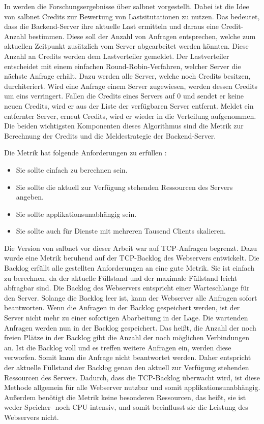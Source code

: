 \documentclass[a4paper, 12pt, BCOR10mm, DIV12, toc=bibliography, toc=listof, german]{scrbook}
\begin{document}
			In \cite{zinke2012} werden die Forschungsergebnisse über salbnet vorgestellt.  Dabei ist die
			Idee von salbnet Credits zur Bewertung von Lastsitutationen zu nutzen. Das bedeutet, dass die
			Backend-Server ihre aktuelle Last ermitteln und daraus eine Credit-Anzahl bestimmen. Diese
			soll der Anzahl von Anfragen entsprechen, welche zum aktuellen Zeitpunkt zusätzlich vom Server
			abgearbeitet werden könnten. Diese Anzahl an Credits werden dem Lastverteiler gemeldet. Der
			Lastverteiler entscheidet mit einem einfachen Round-Robin-Verfahren, welcher Server die
			nächste Anfrage erhält.  Dazu werden alle Server, welche noch Credits besitzen, durchiteriert.
			Wird eine Anfrage einem Server zugewiesen, werden dessen Credits um eins verringert. Fallen
			die Credits eines Servers auf 0 und sendet er keine neuen Credits, wird er aus der Liste der
			verfügbaren Server entfernt. Meldet ein entfernter Server, erneut Credits, wird er wieder in
			die Verteilung aufgenommen. Die beiden wichtigsten Komponenten dieses Algorithmus sind die
			Metrik zur Berechnung der Credits und die Meldestrategie der Backend-Server.

			Die Metrik hat folgende Anforderungen zu erfüllen \cite{scsczile2008}:

			\begin{itemize}
				\item Sie sollte einfach zu berechnen sein.
				\item Sie sollte die aktuell zur Verfügung stehenden Ressourcen des Servers angeben.
				\item Sie sollte applikationsunabhängig sein.
				\item Sie sollte auch für Dienste mit mehreren Tausend Clients skalieren.
			\end{itemize}

			Die Version von salbnet vor dieser Arbeit war auf TCP-Anfragen begrenzt. Dazu wurde eine
			Metrik beruhend auf der TCP-Backlog des Webservers entwickelt. Die Backlog erfüllt alle
			gestellten Anforderungen an eine gute Metrik. Sie ist einfach zu berechnen, da der aktuelle
			Füllstand und der maximale Füllstand leicht abfragbar sind. Die Backlog des Webservers
			entspricht einer Warteschlange für den Server. Solange die Backlog leer ist, kann der
			Webserver alle Anfragen sofort beantworten. Wenn die Anfragen in der Backlog gespeichert
			werden, ist der Server nicht mehr zu einer sofortigen Abarbeitung in der Lage. Die wartenden
			Anfragen werden nun in der Backlog gespeichert. Das heißt, die Anzahl der noch freien Plätze
			in der Backlog gibt die Anzahl der noch möglichen Verbindungen an. Ist die Backlog voll und es
			treffen weitere Anfragen ein, werden diese verworfen.  Somit kann die Anfrage nicht
			beantwortet werden.  Daher entspricht der aktuelle Füllstand der Backlog genau den aktuell zur
			Verfügung stehenden Ressourcen des Servers. Dadurch, dass die TCP-Backlog überwacht wird, ist
			diese Methode allgemein für alle Webserver nutzbar und somit applikationsunabhängig. Außerdem
			benötigt die Metrik keine besonderen Ressourcen, das heißt, sie ist weder Speicher- noch
			CPU-intensiv, und somit beeinflusst sie die Leistung des Webservers nicht.
\end{document}

